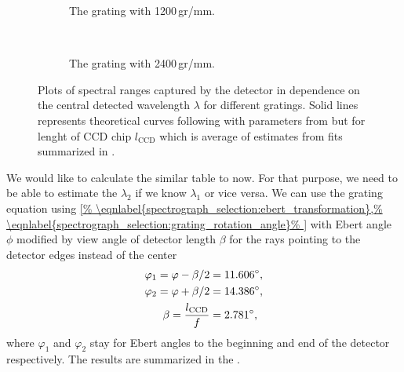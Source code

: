 \begin{figure}
	\centering
	\begin{subfigure}[b]{1\textwidth}
		\centering
		
		\caption{The grating with 1200\,gr/mm.}
		\label{\figlabel{spectrograph_selection:dipsersion_range_1200}}
	\end{subfigure}
	\\
	\begin{subfigure}[b]{1\textwidth}
		\centering
		
		\caption{The grating with 2400\,gr/mm.}
		\label{\figlabel{spectrograph_selection:dipsersion_range_2400}}
	\end{subfigure}
	\caption{Plots of spectral ranges captured by the detector in dependence on
		the central detected wavelength $\lambda$ for different gratings. Solid
		lines represents theoretical curves following
		with parameters from
		but for lenght of CCD chip $l_\text{CCD}$ which is average of estimates
		from fits summarized in
		.}
	\label{\figlabel{spectrograph_selection:dispersion_range}}
\end{figure}

We would like to calculate the similar table to
now. For that purpose, we need to be able to estimate the $\lambda_2$ if we
know $\lambda_1$ or vice versa. We can use the grating equation
using
\cref{%
	\eqnlabel{spectrograph_selection:ebert_transformation},%
	\eqnlabel{spectrograph_selection:grating_rotation_angle}%
}
with Ebert angle $\phi$ modified by view angle of detector length
$\beta$ for the rays pointing to the detector edges instead of the center
\begin{align}
	\begin{split}
		\varphi_1 = \varphi - \beta / 2    &= 11.606^\circ, \\
		\varphi_2 = \varphi + \beta / 2    &= 14.386^\circ, \\
		\beta     = \frac{l_\text{CCD}}{f} &=  2.781^\circ,
	\end{split}
	\label{\eqnlabel{spectrograph_selection:modified_ebert_angles}}
\end{align}
where $\varphi_1$ and $\varphi_2$ stay for Ebert angles to the beginning and
end of the detector respectively. The results are summarized in the
.

